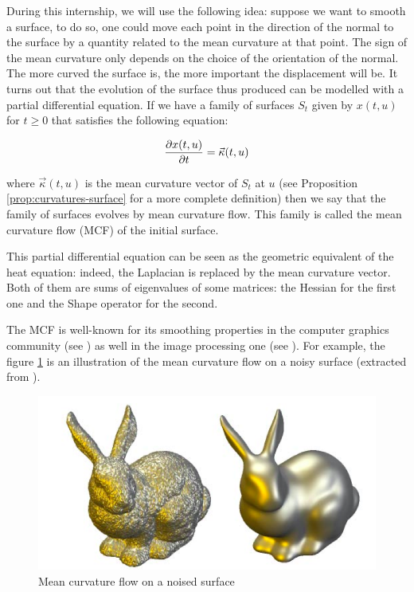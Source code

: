 During this internship, we will use the following idea: suppose we want to
smooth a surface, to do so, one could move each point in the direction of the
normal to the surface by a quantity related to the mean curvature at that point.
The sign of the mean curvature only depends on the choice of the orientation of
the normal.  The more curved the surface is, the more important the displacement
will be. It turns out that the evolution of the surface thus produced can be
modelled with a partial differential equation. If we have a family of surfaces $
S_t $ given by $ x(t, u) $ for $ t \geq 0 $ that satisfies the following
equation:

$$ \frac{\partial{x(t, u)}}{\partial{t}} = \vec{\kappa}(t, u) $$

where $ \vec{\kappa}(t, u) $ is the mean curvature vector of $ S_t $ at $ u $
(see Proposition \ref{prop:curvatures-surface} for a more complete
definition) then we say that the family of surfaces evolves by
mean curvature flow. This family is called the mean curvature flow (MCF) of the
initial surface.

This partial differential equation can be seen as the geometric equivalent of
the heat equation: indeed, the Laplacian is replaced by the mean curvature
vector. Both of them are sums of eigenvalues of some matrices: the Hessian for
the first one and the Shape operator for the second.

The MCF is well-known for its smoothing properties in the computer graphics
community (see \cite{desbrun1999implicit}) as well in the image processing one
(see \cite{ciomaga2010level}). For example, the figure
\ref{fig:mean-curvature-flow-ex} is an illustration of the mean curvature flow
on a noisy surface (extracted from \cite{clarenz2000anisotropic}).

\begin{figure}[h]
    \centering
    \includegraphics[scale=0.3]{img/mean-curvature-flow-rabbit}
    \caption{Mean curvature flow on a noised surface}
    \label{fig:mean-curvature-flow-ex}
\end{figure}

